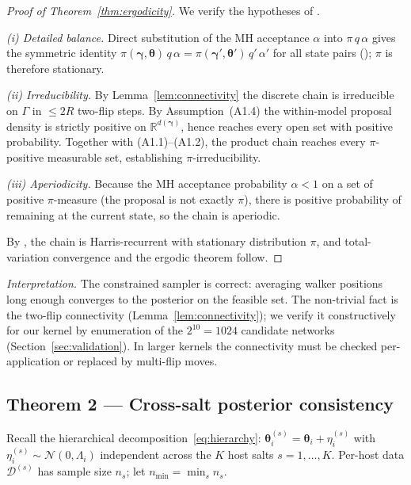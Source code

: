 \documentclass[12pt]{article}
\theoremstyle{plain}
\theoremstyle{definition}
\theoremstyle{remark}
\newcommand{\R}{\mathbb{R}}
\begin{document}
\begin{proof}[Proof of Theorem~\ref{thm:ergodicity}]
We verify the hypotheses of \citet[Theorem~1]{Tierney1994}.

\emph{(i) Detailed balance.}  Direct substitution of the MH acceptance
$\alpha$ into $\pi\,q\,\alpha$ gives the symmetric identity
$\pi(\boldsymbol\gamma,\boldsymbol\theta)\,q\,\alpha=
\pi(\boldsymbol\gamma',\boldsymbol\theta')\,q'\,\alpha'$ for all state
pairs (\citet[Eq.~2]{Tierney1994}); $\pi$ is therefore stationary.

\emph{(ii) Irreducibility.}  By Lemma~\ref{lem:connectivity} the
discrete chain is irreducible on $\Gamma$ in $\le 2R$ two-flip steps.
By Assumption~(A1.4) the within-model proposal density is strictly
positive on $\R^{d(\boldsymbol\gamma)}$, hence reaches every open set
with positive probability.  Together with (A1.1)--(A1.2), the product
chain reaches every $\pi$-positive measurable set, establishing
$\pi$-irreducibility.

\emph{(iii) Aperiodicity.}  Because the MH acceptance probability
$\alpha<1$ on a set of positive $\pi$-measure (the proposal is not
exactly $\pi$), there is positive probability of remaining at the
current state, so the chain is aperiodic.

By \citet[Theorem 1]{Tierney1994}, the chain is Harris-recurrent with
stationary distribution $\pi$, and total-variation convergence and the
ergodic theorem follow.
\end{proof}

\emph{Interpretation.}  The constrained sampler is correct: averaging
walker positions long enough converges to the posterior on the
feasible set.  The non-trivial fact is the two-flip connectivity
(Lemma~\ref{lem:connectivity}); we verify it constructively for our
kernel by enumeration of the $2^{10}=1024$ candidate networks
(Section~\ref{sec:validation}).  In larger kernels the connectivity
must be checked per-application or replaced by multi-flip moves.

\subsection{Theorem 2 --- Cross-salt posterior consistency}\label{sec:thm2}

Recall the hierarchical decomposition~\eqref{eq:hierarchy}:
$\boldsymbol\theta_i^{(s)}=\boldsymbol\theta_i+\eta_i^{(s)}$ with
$\eta_i^{(s)}\sim\mathcal{N}(0,\Lambda_i)$ independent across the $K$
host salts $s=1,\ldots,K$.  Per-host data $\mathcal{D}^{(s)}$ has
sample size $n_s$; let $n_{\min}=\min_s n_s$.
\end{document}
